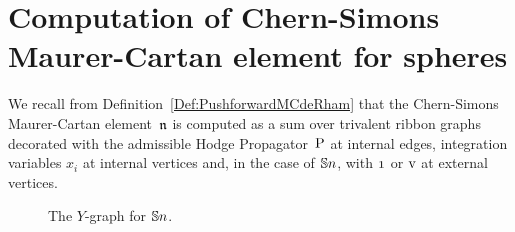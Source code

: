 \documentclass[\MainFolder/Text.tex]{subfiles}
\begin{document}
\section{Computation of Chern-Simons Maurer-Cartan element for spheres}
\label{Section:MCSphere}
We recall from Definition~\ref{Def:PushforwardMCdeRham} that the Chern-Simons Maurer-Cartan element~$\mathfrak{n}$ is computed as a sum over trivalent ribbon graphs decorated with the admissible Hodge Propagator~$\mathrm{P}$ at internal edges, integration variables $x_i$ at internal vertices and, in the case of $\mathbb{S}{n}$, with $\NOne$ or $\mathrm{v}$ at external vertices.
\begin{figure}[t]
\centering

\caption{The $Y$-graph for $\mathbb{S}{n}$.}\label{Fig:YGraph}
\end{figure}
\end{document}
